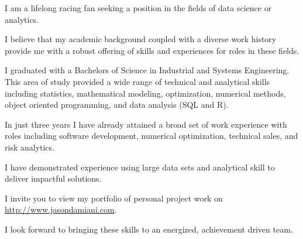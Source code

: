 \documentclass[10pt,a4paper,sans]{moderncv}        %
\begin{document}
I am a lifelong racing fan seeking a position in the fields of data science or analytics.  

I believe that my academic background coupled with a diverse work history provide me with a robust offering of skills and experiences for roles in these fields.

I graduated with a Bachelors of Science in Industrial and Systems Engineering.  This area of study provided a wide range of technical and analytical skills including statistics, mathematical modeling, optimization, numerical methods, object oriented programming, and data analysis (SQL and R).

In just three years I have already attained a broad set of work experience with roles including software development, numerical optimization, technical sales, and risk analytics.

I have demonstrated experience using large data sets and analytical skill to deliver impactful solutions.

I invite you to view my portfolio of personal project work on \url{http://www.jasondamiani.com}.

I look forward to bringing these skills to an energized, achievement driven team.


\makeletterclosing

\end{document}
